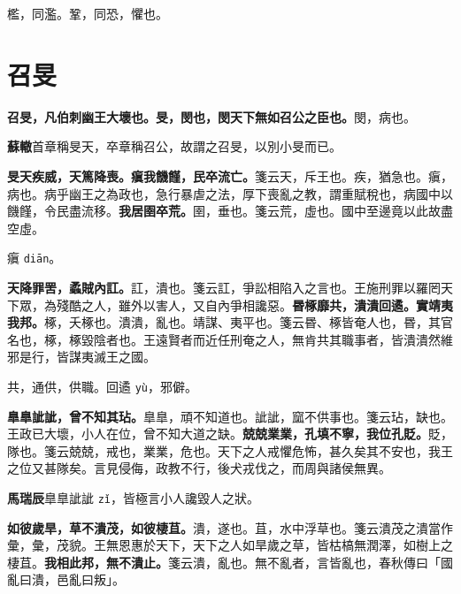 \begin{quoting}檻，同濫。鞏，同恐，懼也。\end{quoting}

\section{召旻}


\textbf{召旻，凡伯刺幽王大壞也。旻，閔也，閔天下無如召公之臣也。}{\footnotesize 閔，病也。}

\begin{quoting}\textbf{蘇轍}首章稱旻天，卒章稱召公，故謂之召旻，以別小旻而已。\end{quoting}

\textbf{旻天疾威，天篤降喪。瘨我饑饉，民卒流亡。}{\footnotesize 箋云天，斥王也。疾，猶急也。瘨，病也。病乎幽王之為政也，急行暴虐之法，厚下喪亂之教，謂重賦稅也，病國中以饑饉，令民盡流移。}\textbf{我居圉卒荒。}{\footnotesize 圉，垂也。箋云荒，虛也。國中至邊竟以此故盡空虛。}

\begin{quoting}瘨 \texttt{diān}。\end{quoting}

\textbf{天降罪罟，蟊賊內訌。}{\footnotesize 訌，潰也。箋云訌，爭訟相陷入之言也。王施刑罪以羅罔天下眾，為殘酷之人，雖外以害人，又自內爭相讒惡。}\textbf{昬椓靡共，潰潰回遹。實靖夷我邦。}{\footnotesize 椓，夭椓也。潰潰，亂也。靖謀、夷平也。箋云昬、椓皆奄人也，昬，其官名也，椓，椓毀陰者也。王遠賢者而近任刑奄之人，無肯共其職事者，皆潰潰然維邪是行，皆謀夷滅王之國。}

\begin{quoting}共，通供，供職。回遹 \texttt{yù}，邪僻。\end{quoting}

\textbf{臯臯訿訿，曾不知其玷。}{\footnotesize 臯臯，頑不知道也。訿訿，窳不供事也。箋云玷，缺也。王政已大壞，小人在位，曾不知大道之缺。}\textbf{兢兢業業，孔填不寧，我位孔貶。}{\footnotesize 貶，隊也。箋云兢兢，戒也，業業，危也。天下之人戒懼危怖，甚久矣其不安也，我王之位又甚隊矣。言見侵侮，政教不行，後犬戎伐之，而周與諸侯無異。}

\begin{quoting}\textbf{馬瑞辰}臯臯訿訿 \texttt{zǐ}，皆極言小人讒毀人之狀。\end{quoting}

\textbf{如彼歲旱，草不潰茂，如彼棲苴。}{\footnotesize 潰，遂也。苴，水中浮草也。箋云潰茂之潰當作彙，彙，茂貌。王無恩惠於天下，天下之人如旱歲之草，皆枯槁無潤澤，如樹上之棲苴。}\textbf{我相此邦，無不潰止。}{\footnotesize 箋云潰，亂也。無不亂者，言皆亂也，春秋傳曰「國亂曰潰，邑亂曰叛」。}

